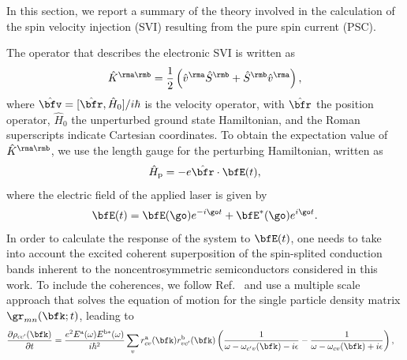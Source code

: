 \documentclass[floatfix,prb,aps,superscriptaddress,showpacs,11pt,preprint,letterpaper]{revtex4}
\begin{document}


In this section, we report a summary of the theory  involved in the
calculation of the spin velocity
injection (SVI) resulting from the
pure spin current (PSC).
 
The operator that describes the electronic SVI is written as
\begin{align}\label{z.1}
\hat K^{\rma\rmb}=\frac{1}{2}\left( \hat v^\rma \hat S^\rmb 
+\hat  S^\rmb \hat v^\rma\right) 
,
\end{align} 
where $\hat\bfv=[\hat\bfr,\hat H_0]/i\hbar$ is the velocity operator, with
$\hat \bfr$ the position operator,  $\hat H_0$ the unperturbed
ground state Hamiltonian, and
the Roman superscripts  indicate Cartesian coordinates. 
To obtain the expectation value of 
$\hat K^{\rma\rmb}$, we use the length gauge for the perturbing
Hamiltonian, written as
\begin{align}\label{z.2}
\hat H_{\text{p}}=-e\hat\bfr\cdot\bfE(t)
,
\end{align}   
where the electric field of the applied laser is given by
\begin{align}\label{z.3}
\bfE(t)= \bfE(\go)e^{-i\go t} + \bfE^*(\go)e^{i\go t}
.
\end{align}
In order to 
calculate the response of the system to $\bfE(t)$, one needs to
take into account the excited coherent superposition
of the spin-splited conduction bands inherent to the 
noncentrosymmetric 
semiconductors considered in this work.
To include the coherences, we follow Ref.~ and
use a multiple
scale approach that solves the equation of motion for the single
particle density matrix $\gr_{mn}(\bfk;t)$, leading to
\begin{align}\label{z.4}
&\frac{\partial \rho_{cc'}(\bfk)}{\partial t} =
\frac{e^{2}E^{\mathrm{a}}(\omega)E^{\mathrm{b*}}(\omega)}
{i \hbar^{2}}
\sum_{v}r^{\mathrm{a}}_{cv}(\bfk) r^{\mathrm{b}}_{vc'}(\bfk)
\left( \frac{1}{\omega - \omega_{c'v}(\bfk) - i \epsilon} 
- 
\frac{1}{\omega - \omega_{cv}(\bfk) + i \epsilon} \right)
,
\end{align}
\end{document}
